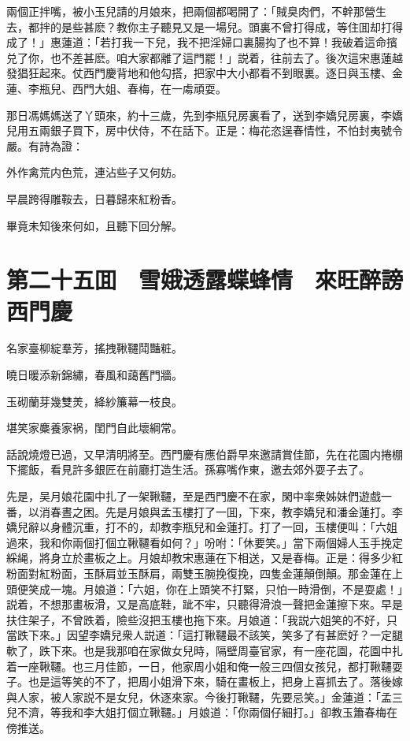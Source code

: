 兩個正拌嘴，被小玉兒請的月娘來，把兩個都喝開了：「賊臭肉們，不幹那營生去，都拌的是些甚麽？教你主子聽見又是一場兒。頭裏不曾打得成，等住囬却打得成了！」惠蓮道：「若打我一下兒，我不把淫婦口裏腸抅了也不算！我破着這命擯兑了你，也不差甚麽。咱大家都離了這門罷！」説着，往前去了。後次這宋惠蓮越發猖狂起來。仗西門慶背地和他勾搭，把家中大小都看不到眼裏。逐日與玉樓、金蓮、李瓶兒、西門大姐、春梅，在一䖏頑耍。

那日馮媽媽送了丫頭來，約十三歲，先到李瓶兒房裏看了，送到李嬌兒房裏，李嬌兒用五兩銀子買下，房中伏侍，不在話下。正是：梅花恣逞春情性，不怕封夷號令嚴。有詩為證：

外作禽荒内色荒，連沾些子又何妨。

早晨跨得雕鞍去，日暮歸來紅粉香。

畢竟未知後來何如，且聽下回分解。

\chapter*{第二十五囬　雪娥透露蝶蜂情　來旺醉謗西門慶}

名家臺柳綻羣芳，搖拽鞦韆鬦豔粧。

曉日暖添新錦繡，春風和藹舊門牆。

玉砌蘭芽幾雙羙，絳紗簾幕一枝良。

堪笑家麋養家祸，閨門自此壞綱常。

話說燒燈已過，又早清明將至。西門慶有應伯爵早來邀請賞佳節，先在花園内捲棚下擺飯，看見許多銀匠在前廳打造生活。孫寡嘴作東，邀去郊外耍子去了。

先是，吴月娘花園中扎了一架鞦韆，至是西門慶不在家，閑中率衆姊妹們遊戲一番，以消春晝之困。先是月娘與孟玉樓打了一囬，下來，教李嬌兒和潘金蓮打。李嬌兒辭以身體沉重，打不的，却教李瓶兒和金蓮打。打了一回，玉樓便叫：「六姐過來，我和你兩個打個立鞦韆看如何？」吩咐：「休要笑。」當下兩個婦人玉手挽定綵䋲，將身立於畫板之上。月娘却教宋惠蓮在下相送，又是春梅。正是：得多少紅粉面對紅粉面，玉酥肩並玉酥肩，兩雙玉腕挽復挽，四隻金蓮顛倒顛。那金蓮在上頭便笑成一塊。月娘道：「六姐，你在上頭笑不打緊，只怕一時滑倒，不是耍處！」説着，不想那畫板滑，又是高底鞋，跐不牢，只聽得滑浪一聲把金蓮擦下來。早是扶住架子，不曾跌着，險些沒把玉樓也拖下來。月娘道：「我説六姐笑的不好，只當跌下來。」因望李嬌兒衆人説道：「這打鞦韆最不該笑，笑多了有甚麽好？一定腿軟了，跌下來。也是我那咱在家做女兒時，隔壁周臺官家，有一座花園，花園中扎着一座鞦韆。也三月佳節，一日，他家周小姐和俺一般三四個女孩兒，都打鞦韆耍子。也是這等笑的不了，把周小姐滑下來，騎在畫板上，把身上喜抓去了。落後嫁與人家，被人家説不是女兒，休逐來家。今後打鞦韆，先要忌笑。」金蓮道：「孟三兒不濟，等我和李大姐打個立鞦韆。」月娘道：「你兩個仔細打。」卻教玉簫春梅在傍推送。

